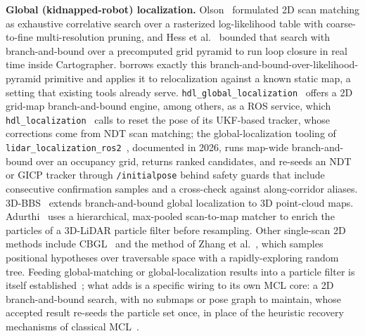 \textbf{Global (kidnapped-robot) localization.}
Olson~\cite{olson2009correlative} formulated 2D scan matching as
exhaustive correlative search over a rasterized log-likelihood table
with coarse-to-fine multi-resolution pruning, and Hess et
al.~\cite{hess2016realtime} bounded that search with branch-and-bound
over a precomputed grid pyramid to run loop closure in real time
inside Cartographer. \prismloc{} borrows exactly this
branch-and-bound-over-likelihood-pyramid primitive and applies it to
relocalization against a known static map, a setting that existing
tools already serve. \texttt{hdl\_global\_localization}~\cite{koide2021hdlgl}
offers a 2D grid-map branch-and-bound engine, among others, as a ROS
service, which \texttt{hdl\_localization}~\cite{koide2019portable}
calls to reset the pose of its UKF-based tracker, whose corrections
come from NDT scan matching; the global-localization tooling of
\texttt{lidar\_localization\_ros2}~\cite{sasaki2026globalloc},
documented in 2026, runs map-wide branch-and-bound over an occupancy
grid, returns ranked candidates, and re-seeds an NDT or GICP tracker
through \texttt{/initialpose} behind safety guards that include
consecutive confirmation samples and a cross-check against
along-corridor aliases. 3D-BBS~\cite{aoki2024bbs3d} extends
branch-and-bound global localization to 3D point-cloud maps.
Adurthi~\cite{adurthi2023scan} uses a hierarchical, max-pooled
scan-to-map matcher to enrich the particles of a 3D-LiDAR particle
filter before resampling. Other single-scan 2D methods include
CBGL~\cite{filotheou2024cbgl} and the method of Zhang et
al.~\cite{zhang2026krp}, which samples positional hypotheses over
traversable space with a rapidly-exploring random tree. Feeding
global-matching or global-localization results into a particle filter
is itself established~\cite{adurthi2023scan,garcia2023mhamcl,akai2023reliable};
what \prismloc{} adds is a specific wiring to its own MCL core: a 2D
branch-and-bound search, with no submaps or pose graph to maintain,
whose accepted result re-seeds the particle set once, in place of the
heuristic recovery mechanisms of classical
MCL~\cite{fox1999efficient,thrun2001robust}.


